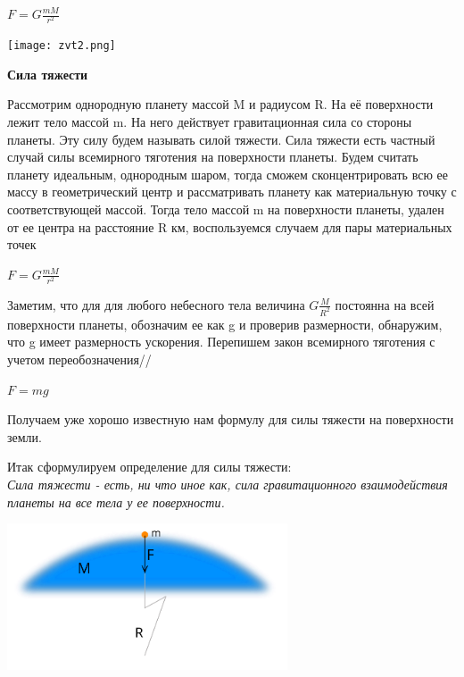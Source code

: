 \documentclass[12pt, letterpaper, twoside]{article}
\begin{document}
\begin{center}
$F=G\frac{mM}{r^2}$\\
\end{center}

\begin{center}
\texttt{[image: zvt2.png]} \\

\end{center}

\begin{center}
    \textbf{Сила тяжести} \\
\end{center}

Рассмотрим однородную планету массой M и радиусом R. На её поверхности лежит тело массой m. На него действует гравитационная сила со стороны планеты. Эту силу будем называть силой тяжести. Сила тяжести есть частный случай силы всемирного тяготения на поверхности планеты.
Будем считать планету идеальным, однородным шаром, тогда сможем сконцентрировать всю ее массу в геометрический центр и рассматривать планету как материальную точку с соответствующей массой. Тогда тело массой m на поверхности планеты, удален от ее центра на расстояние R км, воспользуемся случаем для пары материальных точек 
\begin{center}
   $F=G\frac{mM}{r^2}$\\
\end{center}

	Заметим, что для для любого небесного тела величина
$G\frac{M}{R^2}$ постоянна на всей поверхности планеты, обозначим ее как g и проверив размерности, обнаружим, что g имеет размерность ускорения. Перепишем закон всемирного тяготения с учетом переобозначения//
\begin{center}
   $F=mg$\\

\end{center}

Получаем уже хорошо известную нам формулу для силы тяжести на поверхности земли.

Итак сформулируем определение для силы тяжести:\\
\textit{Сила тяжести - есть, ни что иное как, сила гравитационного взаимодействия планеты на все тела у ее поверхности.}
\begin{center}
   \includegraphics{zvt3.png} \\

\end{center}
\end{document}
